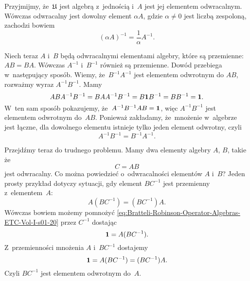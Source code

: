 \documentclass[a4paper,11pt]{article}
\begin{document}
Przyjmijmy, że~$\mathfrak{U}$ jest algebrą z~jednością i~$A$ jest jej elementem
odwracalnym. Wówczas odwracalny jest dowolny element $\alpha A$, gdzie $\alpha \neq 0$
jest liczbą zespoloną, zachodzi bowiem
\begin{equation}
  \label{eq:Bratteli-Robinson-Operator-Algebras-ETC-Vol-I-s01-19}
  ( \alpha A )^{ -1 } = \frac{ 1 }{ \alpha } A^{ -1 }.
\end{equation}

Niech teraz $A$ i~$B$ będą odwracalnymi elementami algebry, które są
przemienne: $A B = B A$. Wówczas $A^{ -1 }$ i~$B^{ -1 }$ również są
przemienne. Dowód przebiega w~następujący sposób. Wiemy,
że~$B^{ -1 } A^{ -1 }$ jest elementem odwrotnym do $A B$, rozważmy
wyraz $A^{ -1 } B^{ -1 }$. Mamy
\begin{equation}
  \label{eq:Bratteli-Robinson-Operator-Algebras-ETC-Vol-I-s01-20}
  A B A^{ -1 } B^{ -1 } = B A A^{ -1 } B^{ -1 } = B \mathbf{1} B^{ -1 } =
  B B^{ -1 } = \mathbf{1}.
\end{equation}
W~ten sam sposób pokazujemy, że~$A^{ -1 } B^{ -1 } A B = \mathbf{1}$, więc
$A^{ -1 } B^{ -1 }$ jest elementem odwrotnym do~$A B$. Ponieważ zakładamy,
że~mnożenie w~algebrze jest łączne, dla dowolnego elementu istnieje tylko
jeden element odwrotny, czyli
\begin{equation}
  \label{eq:Bratteli-Robinson-Operator-Algebras-ETC-Vol-I-s01-21}
  A^{ -1 } B^{ -1 } = B^{ -1 } A^{ -1 }.
\end{equation}

Przejdźmy teraz do trudnego problemu. Mamy dwa elementy algebry $A$, $B$,
takie że
\begin{equation}
  \label{eq:Bratteli-Robinson-Operator-Algebras-ETC-Vol-I-s01-22}
  C = A B
\end{equation}
jest odwracalny. Co można powiedzieć o~odwracalności elementów $A$ i~$B$?
Jeden prosty przykład dotyczy sytuacji, gdy element $B C^{ -1 }$ jest
przemienny z~elementem~$A$:
\begin{equation}
  \label{eq:Bratteli-Robinson-Operator-Algebras-ETC-Vol-I-s01-23}
  A ( B C^{ -1 } ) = ( B C^{ -1 } ) A.
\end{equation}
Wówczas bowiem możemy pomnożyć
\eqref{eq:Bratteli-Robinson-Operator-Algebras-ETC-Vol-I-s01-20} przez
$C^{ -1 }$ dostając
\begin{equation}
  \label{eq:Bratteli-Robinson-Operator-Algebras-ETC-Vol-I-s01-24}
  \mathbf{1} = A ( B C^{ -1 } ).
\end{equation}
Z~przemienności mnożenia $A$ i~$B C^{ -1 }$ dostajemy
\begin{equation}
  \label{eq:Bratteli-Robinson-Operator-Algebras-ETC-Vol-I-s01-25}
  \mathbf{1} = A ( B C^{ -1 } ) = ( B C^{ -1 } ) A.
\end{equation}
Czyli $B C^{ -1 }$ jest elementem odwrotnym do~$A$.
\end{document}
